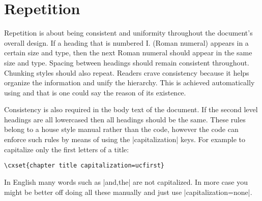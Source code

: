 \section{Repetition}                

Repetition is about being consistent and uniformity throughout the document’s overall design. 
 If a heading
that is numbered I. (Roman numeral) appears in a certain size and type, then
the next Roman numeral should appear in the same size and type. Spacing
between headings should remain consistent throughout. Chunking styles
should also repeat. Readers crave consistency because it helps organize the
information and unify the hierarchy.  This is achieved automatically using \latexe and that
is one could say the reason of its existence.


Consistency is also required in the body text of the document. If the second level headings
are all lowercased then all headings should be the same. These rules belong to a house
style manual rather than the code, however the code can enforce such rules by means
of using the |capitalization| keys. For example to capitalize only the first letters of a title:

\begin{scriptexample}{}{}
\begin{verbatim}
\cxset{chapter title capitalization=ucfirst}
\end{verbatim}
\end{scriptexample}

In English many words such as |and,the| are not capitalized. In more case you might be better off
doing all these manually and just use |capitalization=none|. 

                                                             
